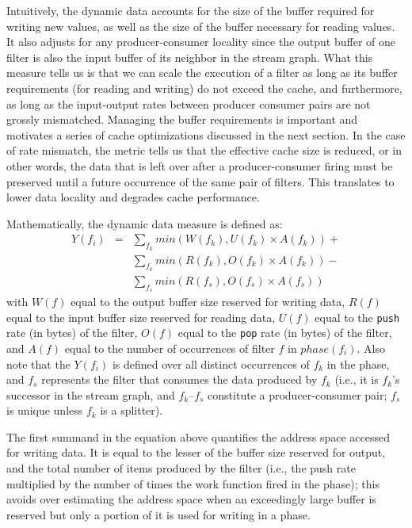 Intuitively, the dynamic data accounts for the size of the buffer
required for writing new values, as well as the size of the buffer
necessary for reading values. It also adjusts for any
producer-consumer locality since the output buffer of one filter is
also the input buffer of its neighbor in the stream graph. What this
measure tells us is that we can scale the execution of a filter as
long as its buffer requirements (for reading and writing) do not
exceed the cache, and furthermore, as long as the input-output rates
between producer consumer pairs are not grossly mismatched. Managing the buffer 
requirements is important and motivates a series of cache
optimizations discussed in the next section. In the case of rate
mismatch, the metric tells us that the effective cache size is
reduced, or in other words, the data that is left over after a
producer-consumer firing must be preserved until a future occurrence of
the same pair of filters. This translates to lower data locality and
degrades cache performance.

Mathematically, the dynamic data measure is defined as:
\begin{eqnarray}
  \nonumber
  Y(f_i) &=&\sum_{f_k} min(W(f_k), U(f_k) \times A(f_k)) + \\
  \nonumber
	   &&\sum_{f_k} min(R(f_k), O(f_k) \times A(f_k)) - \\
  \nonumber
         &&\sum_{f_s} min(R(f_s), O(f_s) \times A(f_s))
\end{eqnarray}
with $W(f)$ equal to the output buffer size reserved for writing data, $R(f)$
equal to the input buffer size reserved for reading data, $U(f)$ equal to the
{\tt push} rate (in bytes) of the filter, $O(f)$ equal to the {\tt pop} rate (in
bytes) of the filter, and $A(f)$ equal to the number of occurrences of
filter $f$ in $phase(f_i)$. Also note that the $Y(f_i)$ is defined
over all distinct occurrences of $f_k$ in the phase, and $f_s$
represents the filter that consumes the data produced by $f_k$ (i.e.,
it is $f_k$'s successor in the stream graph, and $f_k$--$f_s$
constitute a producer-consumer pair; $f_s$ is unique unless $f_k$ is a splitter).

The first summand in the equation above quantifies the address space
accessed for writing data. It is  equal to the lesser of the buffer size
reserved for output, and the total number of items produced by
the filter (i.e., the push rate multiplied by the number of times the
work function fired in the phase); this avoids over estimating the
address space when an exceedingly large buffer is reserved but only a
portion of it is used for writing in a phase.

